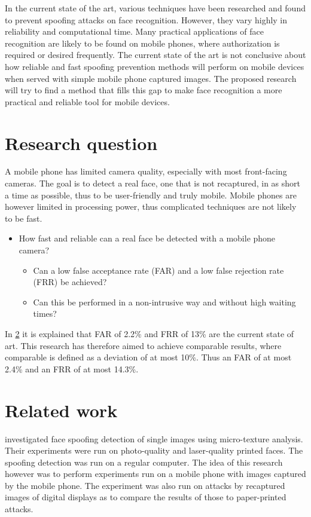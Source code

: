\documentclass{sig-alternate-br}
\begin{document}
In the current state of the art, various techniques have been researched and found to prevent spoofing attacks on face recognition. However, they vary highly in reliability and computational time. Many practical applications of face recognition are likely to be found on mobile phones, where authorization is required or desired frequently. The current state of the art is not conclusive about how reliable and fast spoofing prevention methods will perform on mobile devices when served with simple mobile phone captured images. The proposed research will try to find a method that fills this gap to make face recognition a more practical and reliable tool for mobile devices.

\section{Research question} \label{question}
A mobile phone has limited camera quality, especially with most front-facing cameras. The goal is to detect a real face, one that is not recaptured, in as short a time as possible, thus to be user-friendly and truly mobile. Mobile phones are however limited in processing power, thus complicated techniques are not likely to be fast.

\begin{itemize}
	\item How fast and reliable can a real face be detected with a mobile phone camera?
	\begin{itemize}
		\item Can a low false acceptance rate (FAR) and a low false rejection rate (FRR) be achieved?
		\item Can this be performed in a non-intrusive way and without high waiting times?
	\end{itemize}
\end{itemize}
In \ref{related} it is explained that FAR of 2.2\% and FRR of 13\% are the current state of art. This research has therefore aimed to achieve comparable results, where comparable is defined as a deviation of at most 10\%. Thus an FAR of at most 2.4\% and an FRR of at most 14.3\%.

\section{Related work} \label{related}
\cite{maatta2011face} investigated face spoofing detection of single images using micro-texture analysis. Their experiments were run on photo-quality and laser-quality printed faces. The spoofing detection was run on a regular computer. The idea of this research however was to perform experiments run on a mobile phone with images captured by the mobile phone. The experiment was also run on attacks by recaptured images of digital displays as to compare the results of those to paper-printed attacks.
\end{document}
